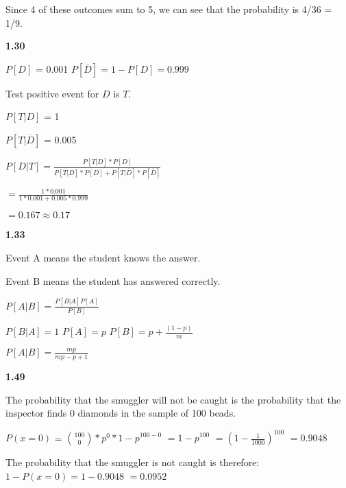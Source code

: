 \documentclass{report}
\begin{document}
Since 4 of these outcomes sum to 5, we can see that the probability is 4/36 = 1/9.
\newline

\textbf{1.30}

$P[D]$ = 0.001
\newline
$P[\overline{D}] = 1-P[D] = 0.999$

Test positive event for $D$ is $T$.

$P[T|D]$ = 1

$P[T|\overline{D}]$ = 0.005
\newline

$P[D|T] = \frac{P[T|D]*P[D]}{P[T|D]*P[D] + P[T|\overline{D}]*P[\overline{D}]}$
\newline

$ = \frac{1*0.001}{1*0.001 + 0.005*0.999}$
\newline

$ = 0.167 \approx 0.17$
\newline


\textbf{1.33}

Event A means the student knows the answer.

Event B means the student has answered correctly.
\newline

$P[A|B] = \frac{P[B|A]P[A]}{P[B]}$
\newline

$P[B|A] = 1$
\newline
$P[A] = p$
\newline
$P[B] = p + \frac{(1-p)}{m}$
\newline

$P[A|B] = \frac{mp}{mp-p+1}$
\newline

\textbf{1.49}

The probability that the smuggler will not be caught is the probability that the inspector finds 0 diamonds in the sample of 100 beads.
\newline

$P(x=0)$ = 
${100 \choose 0} * p^{0} * {1-p}^{100-0}$
\newline
$ = {1-p}^{100}$
\newline
$ = ({1 - \frac{1}{1000}})^{100}$
\newline
$ = 0.9048$

The probability that the smuggler is not caught is therefore: 
\newline
$1-P(x=0) = 1 - 0.9048$ 
\newline
$ = 0.0952$
\newline
\end{document}
